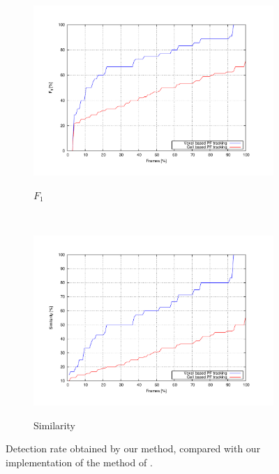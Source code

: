 \begin{figure}[th]
        \begin{subfigure}[b]{0.5\textwidth}
                \centering
                \includegraphics[width=\textwidth, trim=50 40 80 60,clip]{f1}\label{fig:cp05_f1}
                \caption{$F_1$}
                \label{fig:f1Chart}
        \end{subfigure}%
        ~ %
        \begin{subfigure}[b]{0.5\textwidth}
                \centering
                \includegraphics[width=\textwidth, trim=50 40 80 60,clip]{similarity}\label{fig:cp05_similarity}
                \caption{Similarity}
                \label{fig:similarityChart}
        \end{subfigure}
        \caption{Detection rate obtained by our method, compared with our implementation of the method of \cite{danescu2012particle}.}\label{fig:cp05_detection_rate}
\end{figure}

